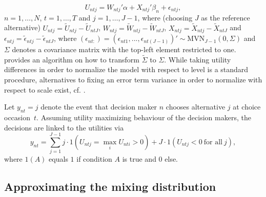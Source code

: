 \documentclass[article]{jss}
\begin{document}
\begin{equation}
\label{eq:model}
U_{ntj} = W_{ntj}'\alpha + X_{ntj}'\beta_n + \epsilon_{ntj},
\end{equation}
$n=1,\dots,N$, $t=1,\dots,T$ and $j=1,\dots,J-1$, where (choosing $J$ as the reference alternative) $U_{ntj}=\tilde{U}_{ntj} - \tilde{U}_{ntJ}$, $W_{ntj}=\tilde{W}_{ntj}-\tilde{W}_{ntJ}$, $X_{ntj}=\tilde{X}_{ntj}-\tilde{X}_{ntJ}$ and $\epsilon_{ntj}=\tilde{\epsilon}_{ntj}-\tilde{\epsilon}_{ntJ}$, where $(\epsilon_{nt:}) = (\epsilon_{nt1},...,\epsilon_{nt(J-1)})'  \sim \text{MVN}_{J-1} (0,\Sigma)$ and $\Sigma$ denotes a covariance matrix with the top-left element restricted to one. \cite{Train:09} provides an algorithm on how to transform $\tilde{\Sigma}$ to $\Sigma$. While taking utility differences in order to normalize the model with respect to level is a standard procedure, alternatives to fixing an error term variance in order to normalize with respect to scale exist, cf. \cite{Mori:14}.

Let $y_{nt}=j$ denote the event that decision maker $n$ chooses alternative $j$ at choice occasion~$t$. Assuming utility maximizing behaviour of the decision makers, the decisions are linked to the utilities via
%
\begin{equation}
\label{eq:choice}
y_{nt} = \sum_{j=1}^{J-1} j\cdot 1 \left (U_{ntj}=\max_i U_{nti}>0 \right) + J \cdot 1\left (U_{ntj}<0 ~\text{for all}~j\right),
\end{equation}
where $1(A)$ equals $1$ if condition $A$ is true and $0$ else.


\subsection{Approximating the mixing distribution} \label{subsec:amd}
\end{document}
